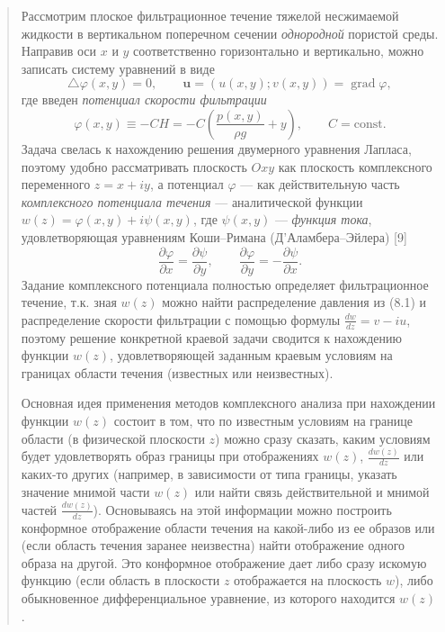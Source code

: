 \documentclass[12pt,a4paper]{article}
\DeclareMathOperator{\grad}{grad}
\newenvironment{textquote}{\begin{quote}\sloppy}{\end{quote}}
\begin{document}
\begin{textquote}
Рассмотрим плоское фильтрационное течение тяжелой несжимаемой жидкости в вертикальном поперечном сечении \textit{однородной} пористой среды. Направив оси $x$ и $y$ соответственно горизонтально и вертикально, можно записать систему уравнений в виде
\[
\triangle\varphi(x,y)=0,\qquad \boldsymbol{u}=(u(x,y);v(x,y))=\grad\varphi,
\]
где введен \textit{потенциал скорости фильтрации}
\begin{equation}
\varphi(x,y)\equiv-CH=-C\left(\frac{p(x,y)}{\rho g}+y\right),\qquad C=\mathrm{const}.
\tag{8.1}\label{q5:eq-8-1}
\end{equation}
Задача свелась к нахождению решения двумерного уравнения Лапласа, поэтому удобно рассматривать плоскость $Oxy$ как плоскость комплексного переменного $z=x+iy$, а потенциал $\varphi$ --- как действительную часть \textit{комплексного потенциала течения} --- аналитической функции $w(z)=\varphi(x,y)+i\psi(x,y)$, где $\psi(x,y)$ --- \textit{функция тока}, удовлетворяющая уравнениям Коши--Римана (Д’Аламбера--Эйлера) [9]
\[
\frac{\partial\varphi}{\partial x}=\frac{\partial\psi}{\partial y},\qquad
\frac{\partial\varphi}{\partial y}=-\frac{\partial\psi}{\partial x}.
\]
Задание комплексного потенциала полностью определяет фильтрационное течение, т.к. зная $w(z)$ можно найти распределение давления из (8.1) и распределение скорости фильтрации с помощью формулы $\frac{dw}{dz}=v-iu$, поэтому решение конкретной краевой задачи сводится к нахождению функции $w(z)$, удовлетворяющей заданным краевым условиям на границах области течения (известных или неизвестных).

Основная идея применения методов комплексного анализа при нахождении функции $w(z)$ состоит в том, что по известным условиям на границе области (в физической плоскости $z$) можно сразу сказать, каким условиям будет удовлетворять образ границы при отображениях $w(z)$, $\frac{dw(z)}{dz}$ или каких-то других (например, в зависимости от типа границы, указать значение мнимой части $w(z)$ или найти связь действительной и мнимой частей $\frac{dw(z)}{dz}$). Основываясь на этой информации можно построить конформное отображение области течения на какой-либо из ее образов или (если
область течения заранее неизвестна) найти отображение одного образа на другой. Это конформное отображение дает либо сразу искомую функцию (если область в плоскости $z$ отображается на плоскость $w$), либо обыкновенное дифференциальное уравнение, из которого находится $w(z)$.
\end{textquote}
\end{document}
